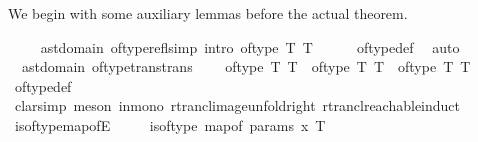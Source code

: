 \begin{isabellebody}
\begin{isamarkuptext}
    We begin with some auxiliary lemmas before the actual theorem.%
\end{isamarkuptext}\isamarkuptrue%
\ \ \isamarkupfalse%
\ {\isacharparenleft}{\kern0pt}\ ast{\isacharunderscore}{\kern0pt}domain{\isacharparenright}{\kern0pt}\ of{\isacharunderscore}{\kern0pt}type{\isacharunderscore}{\kern0pt}refl{\isacharbrackleft}{\kern0pt}simp{\isacharcomma}{\kern0pt}\ intro{\isacharbang}{\kern0pt}{\isacharbrackright}{\kern0pt}{\isacharcolon}{\kern0pt}\ {\isachardoublequoteopen}of{\isacharunderscore}{\kern0pt}type\ T\ T{\isachardoublequoteclose}\isanewline
%
\isadelimproof
\ \ \ \ %
\endisadelimproof
%
\isatagproof
{}\isamarkupfalse%
\ of{\isacharunderscore}{\kern0pt}type{\isacharunderscore}{\kern0pt}def\ \isamarkupfalse%
\ auto%
\endisatagproof
{\isafoldproof}%
%
\isadelimproof
\isanewline
%
\endisadelimproof
\isanewline
\ \ \isamarkupfalse%
\ {\isacharparenleft}{\kern0pt}\ ast{\isacharunderscore}{\kern0pt}domain{\isacharparenright}{\kern0pt}\ of{\isacharunderscore}{\kern0pt}type{\isacharunderscore}{\kern0pt}trans{\isacharbrackleft}{\kern0pt}trans{\isacharbrackright}{\kern0pt}{\isacharcolon}{\kern0pt}\isanewline
\ \ \ \ {\isachardoublequoteopen}of{\isacharunderscore}{\kern0pt}type\ T{}\ T{}\ {\isasymLongrightarrow}\ of{\isacharunderscore}{\kern0pt}type\ T{}\ T{}\ {\isasymLongrightarrow}\ of{\isacharunderscore}{\kern0pt}type\ T{}\ T{}{\isachardoublequoteclose}\isanewline
%
\isadelimproof
\ \ \ \ %
\endisadelimproof
%
\isatagproof
{}\isamarkupfalse%
\ of{\isacharunderscore}{\kern0pt}type{\isacharunderscore}{\kern0pt}def\isanewline
\ \ \ \ \isamarkupfalse%
\ clarsimp\ {\isacharparenleft}{\kern0pt}meson\ in{\isacharunderscore}{\kern0pt}mono\ rtrancl{\isacharunderscore}{\kern0pt}image{\isacharunderscore}{\kern0pt}unfold{\isacharunderscore}{\kern0pt}right\ rtrancl{\isacharunderscore}{\kern0pt}reachable{\isacharunderscore}{\kern0pt}induct{\isacharparenright}{\kern0pt}%
\endisatagproof
{\isafoldproof}%
%
\isadelimproof
\ \isanewline
%
\endisadelimproof
\isanewline
\ \ \isamarkupfalse%
\ is{\isacharunderscore}{\kern0pt}of{\isacharunderscore}{\kern0pt}type{\isacharunderscore}{\kern0pt}map{\isacharunderscore}{\kern0pt}ofE{\isacharcolon}{\kern0pt}\isanewline
\ \ \ \ \ {\isachardoublequoteopen}is{\isacharunderscore}{\kern0pt}of{\isacharunderscore}{\kern0pt}type\ {\isacharparenleft}{\kern0pt}map{\isacharunderscore}{\kern0pt}of\ params{\isacharparenright}{\kern0pt}\ x\ T{\isachardoublequoteclose}\isanewline

\end{isabellebody}
